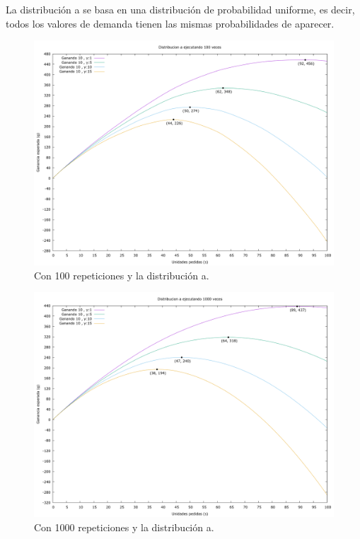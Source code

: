 \documentclass[12pt, spanish]{article}
\begin{document}
La distribución a se basa en una distribución de probabilidad uniforme, es decir, todos los valores de demanda tienen las mismas probabilidades de aparecer.

\begin{figure}[H]
	\centering
	\includegraphics[scale = 0.2]{prob_a/datos_a_100.png}
	\caption{Con 100 repeticiones y la distribución a.}
	\label{fig:ej1_a_100}

\end{figure}

\begin{figure}[H]
	\centering
	\includegraphics[scale = 0.2]{prob_a/datos_a_1000.png}
	\caption{Con 1000 repeticiones y la distribución a.}
	\label{fig:ej1_a_1000}

\end{figure}
\end{document}
